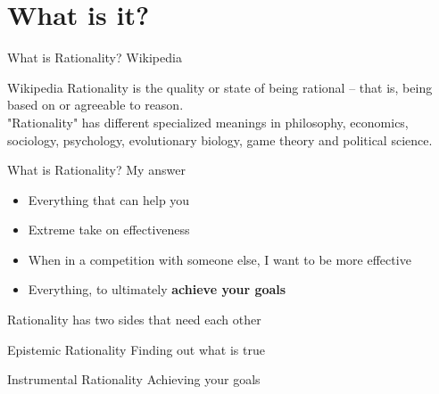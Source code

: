 
\section{What is it?}

\begin{frame}[c]{What is Rationality? Wikipedia}
    \pause
    \begin{qblock}{Wikipedia}
    Rationality is the quality or state of being rational – that is, being
    based on or agreeable to reason. \\

    "Rationality" has different specialized meanings in philosophy,
    economics, sociology, psychology, evolutionary biology, game theory and
    political science.
    \end{qblock}
\end{frame}


\begin{frame}[c]{What is Rationality? My answer}
    \Large
    \begin{itemize}[<+(1)->]
        \item Everything that can help you
        \item Extreme take on effectiveness
        \item When in a competition with someone else, I want to be more effective
        \item Everything, to ultimately \newline \textbf{achieve your goals}
    \end{itemize}
\end{frame}


\begin{frame}[c]{Rationality has two sides that need each other}
    \pause
    \begin{qblock}{Epistemic Rationality}
        Finding out what is true
    \end{qblock}

    \pause
    \vspace{1cm}

    \begin{qblock}{Instrumental Rationality}
        Achieving your goals
    \end{qblock}
\end{frame}


